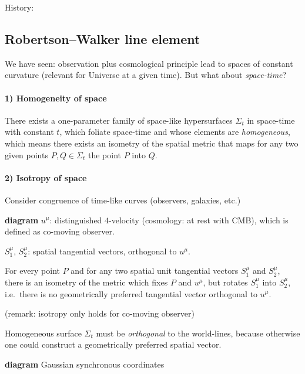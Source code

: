History: \cite{schwarzschild1900ueber,Reboucas2005}


\subsection{Robertson--Walker line element}
We have seen: observation plus cosmological principle lead to spaces of 
constant curvature (relevant for Universe at a given time). But what about 
\emph{space-time}?

\paragraph{1) Homogeneity of space}
There exists a one-parameter family of space-like hypersurfaces $\Sigma_t$ in 
space-time with constant $t$, which foliate space-time and whose elements are 
\emph{homogeneous}, which means there exists an isometry of the spatial metric 
that maps for any two given points $P, Q \in \Sigma_t$ the point $P$ into $Q$.

\paragraph{2) Isotropy of space}
Consider congruence of time-like curves (observers, galaxies, etc.)

\textbf{diagram}
$u^\mu$: distinguished $4$-velocity (cosmology: at rest with CMB), which is 
defined as co-moving observer.

$S^\mu_1$, $S^\mu_2$: spatial tangential vectors, orthogonal to $u^\mu$.

For every point $P$ and for any two spatial unit tangential vectors $S^\mu_1$ 
and $S^\mu_2$, there is an isometry of the metric which fixes $P$ and $u^\mu$, 
but rotates $S^\mu_1$ into $S^\mu_2$, i.e.\ there is no geometrically preferred 
tangential vector orthogonal to $u^\mu$.

(remark: isotropy only holds for co-moving observer)

Homogeneous surface $\Sigma_t$ must be \emph{orthogonal} to the world-lines, 
because otherwise one could construct a geometrically preferred spatial vector.

\textbf{diagram} Gaussian synchronous coordinates

